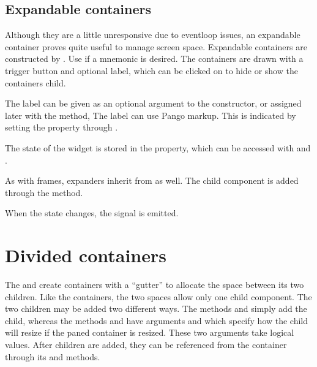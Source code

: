 \subsection{Expandable containers}
\label{sec:RGtk2:gtkExpander}

Although they are a little unresponsive due to eventloop issues, an
expandable container proves quite useful to manage screen space. Expandable containers are
constructed by . Use
 if a mnemonic is desired. The
containers are drawn with a trigger button and optional label, which can be
clicked on to hide or show the containers child.

The label can be given as an optional argument to the constructor, or
assigned later with the  method, The label can use
Pango markup. This is indicated by setting the 
property  through . 

The state of the widget is stored in the  property,
which can be accessed with  and
. 

As with frames, expanders inherit from  as well. The
child component is added through the   method.

When the state changes, the  signal is emitted.



\section{Divided containers}
\label{sec:RGtk2:gtkPanedWindow}

The  and  create
containers with a ``gutter'' to allocate the space between its two
children. 
Like the  containers,
the two spaces allow only one child component. The two children may be
added two different ways. The methods  and
 simply add the child, whereas the methods
 and  have arguments
 and 
which specify how the child will resize if the paned container is
resized. These two arguments take logical values.  After children are
added, they can be referenced from the container through its
 and  methods.

